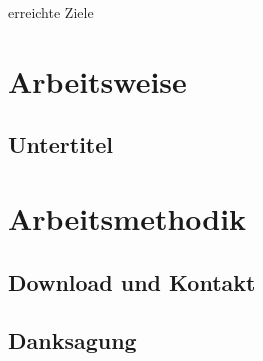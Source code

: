 erreichte Ziele

\section{Arbeitsweise}


\subsection{Untertitel}

\section{Arbeitsmethodik}

\subsection{Download und Kontakt}

\subsection{Danksagung}
